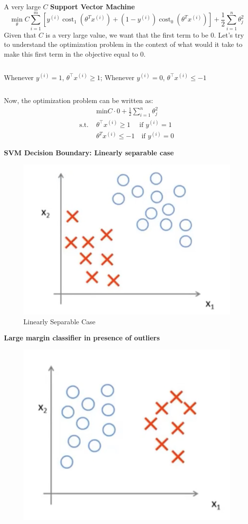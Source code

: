 \documentclass[9pt,dvipsnames]{beamer}
\begin{document}
\begin{frame}{A very large \(C\)}
	\textbf{Support Vector Machine}
	$$
	\min _\theta C \sum_{i=1}^m\left[y^{(i)} \operatorname{cost}_1\left(\theta^T x^{(i)}\right)+\left(1-y^{(i)}\right) \operatorname{cost}_0\left(\theta^T x^{(i)}\right)\right]+\frac{1}{2} \sum_{i=1}^n \theta_j^2
	$$
	Given that \(C\) is a very large value, we want that the first term to be \(0\). Let's try to understand the optimization problem in the context of what would it take to make this first term in the objective equal to \(0\). 
	\vspace{0.3cm}
	\begin{columns}
		Whenever \(y^{(i)}=1\), \(\theta^{\top} x^{(i)} \geqslant 1\); 
		Whenever \(y^{(i)}=0\), \(\theta^{\top} x^{(i)} \leqslant-1\)
	\end{columns}
	
	Now, the optimization problem can be written as: 
	\begin{equation*}
		\begin{aligned}
			& \text{min} C\cdot 0 + \frac{1}{2}\sum_{i=1}^n \theta_j^2 \\
			\text{s.t.  } &  \theta^{\top} x^{(i)} \geqslant 1 \quad \text { if } y^{(i)}=1 \\
			& \theta^{T} x^{(i)} \leqslant-1 \quad \text {if } y^{(i)}=0
		\end{aligned}
	\end{equation*}
\end{frame}

\begin{frame}
	\textbf{SVM Decision Boundary: Linearly separable case}
\begin{figure}
	\centering
	\includegraphics[width=0.4\linewidth]{imgs/svm_6}
	\caption{Linearly Separable Case}
	\label{fig:svm6}
\end{figure}
\end{frame}

\begin{frame}
	\textbf{Large margin classifier in presence of outliers}
	\begin{figure}
		\centering
		\includegraphics[width=0.4\linewidth]{imgs/svm_7}
		\label{fig:svm7}
	\end{figure}
\end{frame}
\end{document}
